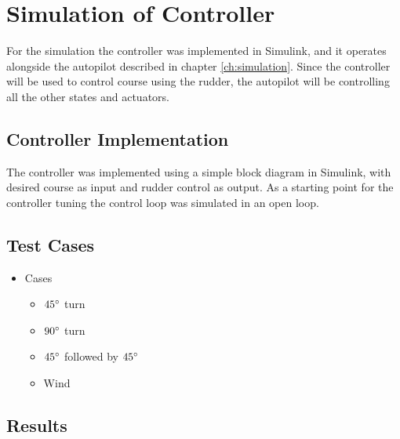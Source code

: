 \section{Simulation of Controller}

For the simulation the controller was implemented in Simulink, and it operates alongside the autopilot described in chapter \ref{ch:simulation}. Since the controller will be used to control course using the rudder, the autopilot will be controlling all the other states and actuators.


\subsection{Controller Implementation}

The controller was implemented using a simple block diagram in Simulink, with desired course as input and rudder control as output. As a starting point for the controller tuning the control loop was simulated in an open loop. 

\subsection{Test Cases}


\begin{itemize}
	\item Cases
	\begin{itemize}
		\item $45\degree$ turn
		\item $90\degree$ turn
		\item $45\degree$ followed by $45\degree$
		\item Wind
	\end{itemize}
\end{itemize}


\subsection{Results}
